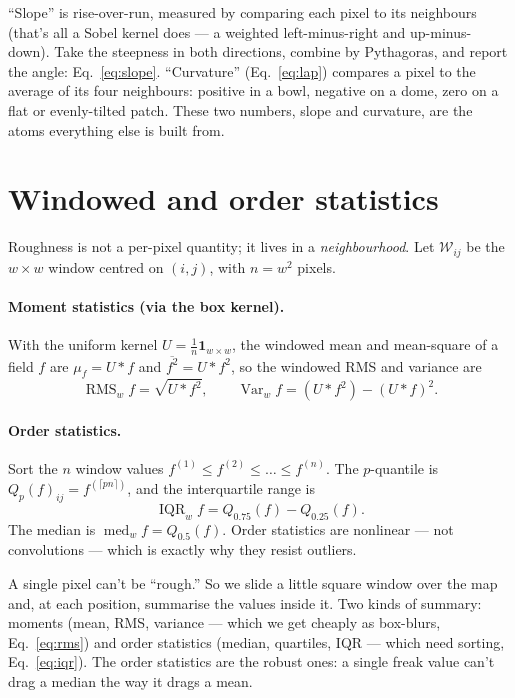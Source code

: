 \documentclass[11pt]{article}
\theoremstyle{definition}
\newcommand{\med}{\operatorname{med}}
\newcommand{\IQR}{\operatorname{IQR}}
\newcommand{\conv}{\mathbin{\ast}}
\begin{document}
\begin{words}
``Slope'' is rise-over-run, measured by comparing each pixel to its neighbours
(that's all a Sobel kernel does --- a weighted left-minus-right and up-minus-down).
Take the steepness in both directions, combine by Pythagoras, and report the angle:
Eq.~\eqref{eq:slope}. ``Curvature'' (Eq.~\ref{eq:lap}) compares a pixel to the
average of its four neighbours: positive in a bowl, negative on a dome, zero on a
flat or evenly-tilted patch. These two numbers, slope and curvature, are the atoms
everything else is built from.
\end{words}

\section{Windowed and order statistics}

Roughness is not a per-pixel quantity; it lives in a \emph{neighbourhood}. Let
$\mathcal{W}_{ij}$ be the $w\times w$ window centred on $(i,j)$, with
$n=w^2$ pixels.

\paragraph{Moment statistics (via the box kernel).} With the uniform kernel
$U=\frac{1}{n}\mathbf{1}_{w\times w}$, the windowed mean and mean-square of a field
$f$ are $\mu_f=U\conv f$ and $\overline{f^2}=U\conv f^2$, so the windowed RMS and
variance are
\begin{equation}
\operatorname{RMS}_w f=\sqrt{U\conv f^2},\qquad
\operatorname{Var}_w f=(U\conv f^2)-(U\conv f)^2 .
\label{eq:rms}
\end{equation}

\paragraph{Order statistics.} Sort the $n$ window values
$f^{(1)}\le f^{(2)}\le\dots\le f^{(n)}$. The $p$-quantile is
$Q_p(f)_{ij}=f^{(\lceil pn\rceil)}$, and the interquartile range is
\begin{equation}
\IQR_w f = Q_{0.75}(f)-Q_{0.25}(f).
\label{eq:iqr}
\end{equation}
The median is $\med_w f=Q_{0.5}(f)$. Order statistics are nonlinear --- not
convolutions --- which is exactly why they resist outliers.

\begin{words}
A single pixel can't be ``rough.'' So we slide a little square window over the map
and, at each position, summarise the values inside it. Two kinds of summary: moments
(mean, RMS, variance --- which we get cheaply as box-blurs, Eq.~\ref{eq:rms}) and
order statistics (median, quartiles, IQR --- which need sorting, Eq.~\ref{eq:iqr}).
The order statistics are the robust ones: a single freak value can't drag a median
the way it drags a mean.
\end{words}
\end{document}
